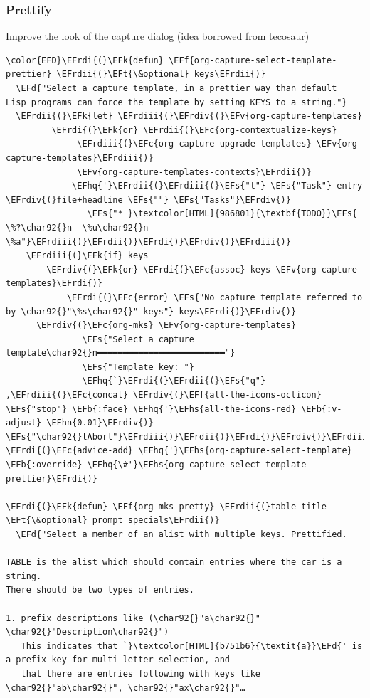 \documentclass{scrartcl}
\newcommand{\EFk}[1]{\textcolor{EFk}{#1}} %
\newcommand{\EFd}[1]{\textcolor{EFd}{\textit{#1}}} %
\newcommand{\EFt}[1]{\textcolor{EFt}{#1}} %
\newcommand{\EFs}[1]{\textcolor{EFs}{#1}} %
\newcommand{\EFb}[1]{\textcolor{EFb}{#1}} %
\newcommand{\EFc}[1]{\textcolor{EFc}{#1}} %
\newcommand{\EFv}[1]{\textcolor{EFv}{#1}} %
\newcommand{\EFf}[1]{\textcolor{EFf}{#1}} %
\newcommand{\EFhn}[1]{\textcolor{EFhn}{\textbf{#1}}} %
\newcommand{\EFhq}[1]{\textcolor{EFhq}{#1}} %
\newcommand{\EFhs}[1]{\textcolor{EFhs}{#1}} %
\newcommand{\EFrdi}[1]{\textcolor{EFrdi}{#1}} %
\newcommand{\EFrdii}[1]{\textcolor{EFrdii}{#1}} %
\newcommand{\EFrdiii}[1]{\textcolor{EFrdiii}{#1}} %
\newcommand{\EFrdiv}[1]{\textcolor{EFrdiv}{#1}} %
\begin{document}
\subsubsection{Prettify}
\label{sec:orgd10ed9a}
Improve the look of the capture dialog (idea borrowed from \href{https://github.com/tecosaur}{tecosaur})
\begin{Code}
\begin{Verbatim}[]
\color{EFD}\EFrdi{(}\EFk{defun} \EFf{org-capture-select-template-prettier} \EFrdii{(}\EFt{\&optional} keys\EFrdii{)}
  \EFd{"Select a capture template, in a prettier way than default
Lisp programs can force the template by setting KEYS to a string."}
  \EFrdii{(}\EFk{let} \EFrdiii{(}\EFrdiv{(}\EFv{org-capture-templates}
         \EFrdi{(}\EFk{or} \EFrdii{(}\EFc{org-contextualize-keys}
              \EFrdiii{(}\EFc{org-capture-upgrade-templates} \EFv{org-capture-templates}\EFrdiii{)}
              \EFv{org-capture-templates-contexts}\EFrdii{)}
             \EFhq{'}\EFrdii{(}\EFrdiii{(}\EFs{"t"} \EFs{"Task"} entry \EFrdiv{(}file+headline \EFs{""} \EFs{"Tasks"}\EFrdiv{)}
                \EFs{"* }\textcolor[HTML]{986801}{\textbf{TODO}}\EFs{ \%?\char92{}n  \%u\char92{}n  \%a"}\EFrdiii{)}\EFrdii{)}\EFrdi{)}\EFrdiv{)}\EFrdiii{)}
    \EFrdiii{(}\EFk{if} keys
        \EFrdiv{(}\EFk{or} \EFrdi{(}\EFc{assoc} keys \EFv{org-capture-templates}\EFrdi{)}
            \EFrdi{(}\EFc{error} \EFs{"No capture template referred to by \char92{}"\%s\char92{}" keys"} keys\EFrdi{)}\EFrdiv{)}
      \EFrdiv{(}\EFc{org-mks} \EFv{org-capture-templates}
               \EFs{"Select a capture template\char92{}n━━━━━━━━━━━━━━━━━━━━━━━━━"}
               \EFs{"Template key: "}
               \EFhq{`}\EFrdi{(}\EFrdii{(}\EFs{"q"} ,\EFrdiii{(}\EFc{concat} \EFrdiv{(}\EFf{all-the-icons-octicon} \EFs{"stop"} \EFb{:face} \EFhq{'}\EFhs{all-the-icons-red} \EFb{:v-adjust} \EFhn{0.01}\EFrdiv{)} \EFs{"\char92{}tAbort"}\EFrdiii{)}\EFrdii{)}\EFrdi{)}\EFrdiv{)}\EFrdiii{)}\EFrdii{)}\EFrdi{)}
\EFrdi{(}\EFc{advice-add} \EFhq{'}\EFhs{org-capture-select-template} \EFb{:override} \EFhq{\#'}\EFhs{org-capture-select-template-prettier}\EFrdi{)}

\EFrdi{(}\EFk{defun} \EFf{org-mks-pretty} \EFrdii{(}table title \EFt{\&optional} prompt specials\EFrdii{)}
  \EFd{"Select a member of an alist with multiple keys. Prettified.

TABLE is the alist which should contain entries where the car is a string.
There should be two types of entries.

1. prefix descriptions like (\char92{}"a\char92{}" \char92{}"Description\char92{}")
   This indicates that `}\textcolor[HTML]{b751b6}{\textit{a}}\EFd{' is a prefix key for multi-letter selection, and
   that there are entries following with keys like \char92{}"ab\char92{}", \char92{}"ax\char92{}"…


\end{Verbatim}
\end{Code}
\end{document}
